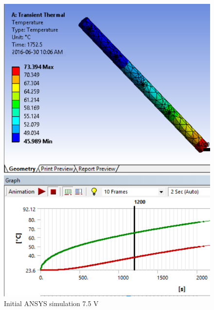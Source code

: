 \documentclass[letterpaper,titlepage,oneside]{report}
\begin{document}
\begin{figure}[ht]
  \centering
  \includegraphics[width=.5\textwidth]{ansysrod}
  \caption{Initial ANSYS simulation 7.5 V}
  \label{fig:ansysrod}
\end{figure}
\end{document}
